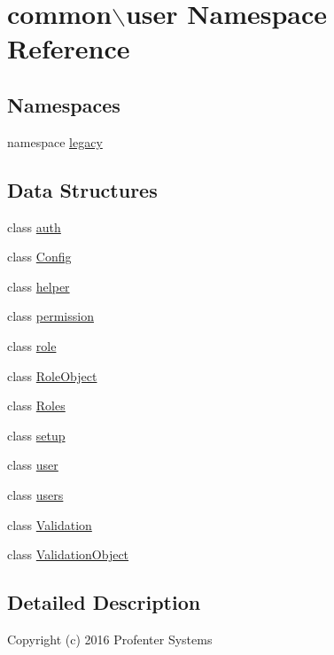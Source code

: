 \hypertarget{namespacecommon_1_1user}{\section{common$\backslash$user \-Namespace \-Reference}
\label{namespacecommon_1_1user}
}
\subsection*{\-Namespaces}
\begin{DoxyCompactItemize}
\item 
namespace \hyperlink{namespacecommon_1_1user_1_1legacy}{legacy}
\end{DoxyCompactItemize}
\subsection*{\-Data \-Structures}
\begin{DoxyCompactItemize}
\item 
class \hyperlink{classcommon_1_1user_1_1auth}{auth}
\item 
class \hyperlink{classcommon_1_1user_1_1_config}{\-Config}
\item 
class \hyperlink{classcommon_1_1user_1_1helper}{helper}
\item 
class \hyperlink{classcommon_1_1user_1_1permission}{permission}
\item 
class \hyperlink{classcommon_1_1user_1_1role}{role}
\item 
class \hyperlink{classcommon_1_1user_1_1_role_object}{\-Role\-Object}
\item 
class \hyperlink{classcommon_1_1user_1_1_roles}{\-Roles}
\item 
class \hyperlink{classcommon_1_1user_1_1setup}{setup}
\item 
class \hyperlink{classcommon_1_1user_1_1user}{user}
\item 
class \hyperlink{classcommon_1_1user_1_1users}{users}
\item 
class \hyperlink{classcommon_1_1user_1_1_validation}{\-Validation}
\item 
class \hyperlink{classcommon_1_1user_1_1_validation_object}{\-Validation\-Object}
\end{DoxyCompactItemize}


\subsection{\-Detailed \-Description}
\-Copyright (c) 2016 \-Profenter \-Systems

